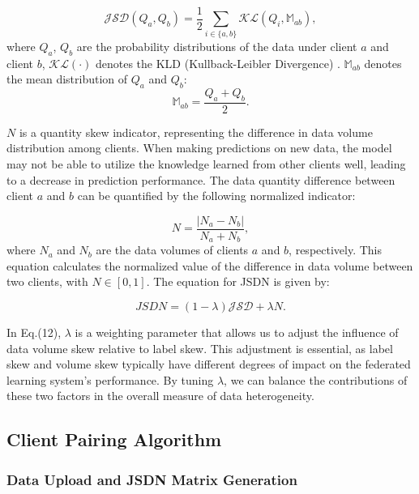 \documentclass[journal,twoside,web]{ieeecolor}
\begin{document}
\begin{equation}
\mathcal{JSD}(Q_a,Q_b) = \frac{1}{2} \sum_{i \in \{a, b\}} \mathcal{KL}(Q_i, \mathbb{M}_{ab}),
\end{equation}
where $Q_a$, $Q_b$ are the probability distributions of the data under client $a$ and client $b$, $\mathcal{KL}(\cdot)$ denotes the KLD (Kullback-Leibler Divergence) \cite{kl}. $\mathbb{M}_{ab}$ denotes the mean distribution of $Q_a$ and $Q_b$:
\begin{equation}
\mathbb{M}_{ab} = \frac{Q_a + Q_b}{2}.
\end{equation}

\( N \) is a quantity skew indicator, representing the difference in data volume distribution among clients. When making predictions on new data, the model may not be able to utilize the knowledge learned from other clients well, leading to a decrease in prediction performance. The data quantity difference between client $a$ and $b$ can be quantified by the following normalized indicator:

\begin{equation}
N = \frac{|N_a - N_b|}{N_a + N_b},
\end{equation}
where \( N_a \) and \( N_b \) are the data volumes of clients \( a \) and \( b \), respectively. This equation calculates the normalized value of the difference in data volume between two clients, with \( N \in [0, 1] \). The equation for JSDN is given by:
 
\begin{equation}
JSDN = (1-\lambda)\mathcal{JSD} + \lambda {N}.
\end{equation}

In Eq.(12), \(\lambda\) is a weighting parameter that allows us to adjust the influence of data volume skew relative to label skew. This adjustment is essential, as label skew and volume skew typically have different degrees of impact on the federated learning system's performance. By tuning \(\lambda\), we can balance the contributions of these two factors in the overall measure of data heterogeneity.

\subsection{Client Pairing Algorithm}
\subsubsection{Data Upload and JSDN Matrix Generation}
\end{document}

